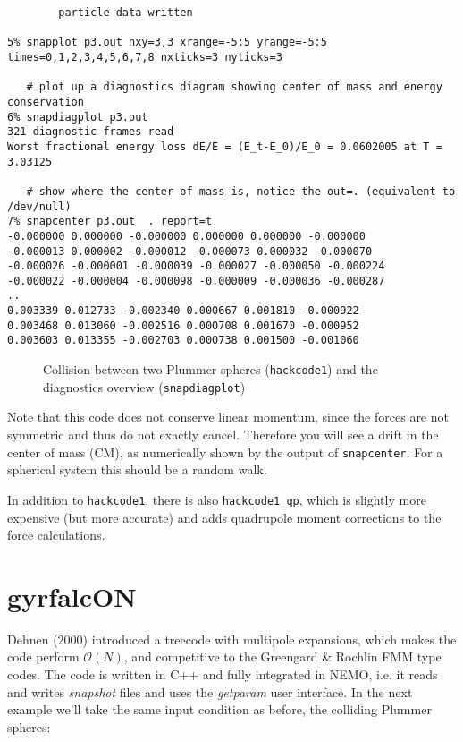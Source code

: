 {\begin{verbatim}
        particle data written

5% snapplot p3.out nxy=3,3 xrange=-5:5 yrange=-5:5 times=0,1,2,3,4,5,6,7,8 nxticks=3 nyticks=3

   # plot up a diagnostics diagram showing center of mass and energy conservation
6% snapdiagplot p3.out
321 diagnostic frames read
Worst fractional energy loss dE/E = (E_t-E_0)/E_0 = 0.0602005 at T = 3.03125

   # show where the center of mass is, notice the out=. (equivalent to /dev/null)
7% snapcenter p3.out  . report=t
-0.000000 0.000000 -0.000000 0.000000 0.000000 -0.000000
-0.000013 0.000002 -0.000012 -0.000073 0.000032 -0.000070
-0.000026 -0.000001 -0.000039 -0.000027 -0.000050 -0.000224
-0.000022 -0.000004 -0.000098 -0.000009 -0.000036 -0.000287
..
0.003339 0.012733 -0.002340 0.000667 0.001810 -0.000922
0.003468 0.013060 -0.002516 0.000708 0.001670 -0.000952
0.003603 0.013355 -0.002703 0.000738 0.001500 -0.001060

\end{verbatim}\normalsize

\begin{figure}[h!]
\caption[Collision between two Plummer spheres]
{Collision between two Plummer spheres ({\tt hackcode1}) 
and the diagnostics overview ({\tt snapdiagplot})
}
\label{f:coll}
\end{figure}


Note that this code does not conserve linear momentum, since the
forces are not symmetric and thus do not exactly cancel. Therefore
you will see a drift in the center of mass (CM), as numerically
shown by the output of {\tt snapcenter}. For a spherical system this should
be a random walk.

In addition to {\tt hackcode1}, there is also
{\tt hackcode1\_qp}, which is slightly more expensive (but more accurate) and adds
quadrupole moment corrections to the force calculations. 

\section{gyrfalcON}

Dehnen (2000) introduced a treecode with multipole expansions, which makes
the code perform $\mathcal{O}(N)$, and competitive to the
Greengard \& Rochlin FMM type codes. The code is written in C++ and fully integrated
in NEMO, i.e. it reads and writes {\it snapshot} files and uses the
{\it getparam} user interface. In the next example we'll take the same input condition
as before, the colliding Plummer spheres:


}
